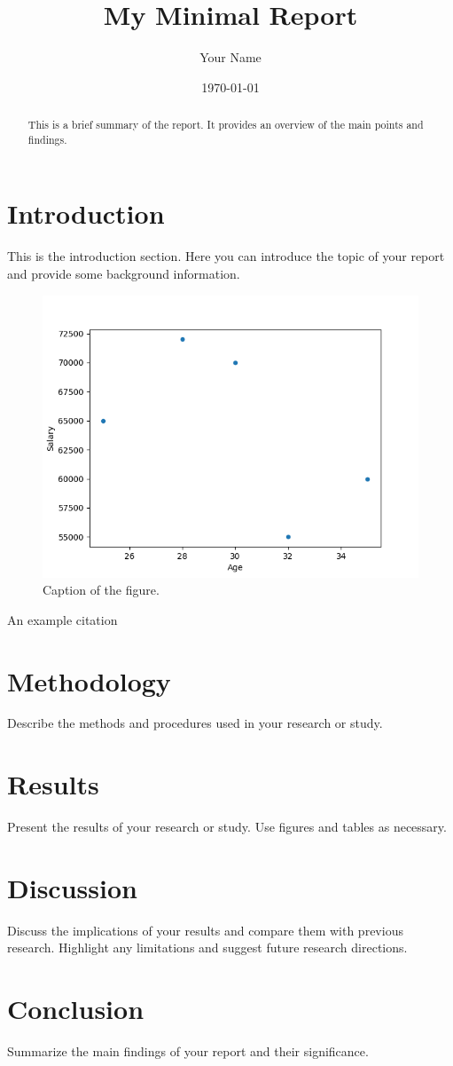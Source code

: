 \documentclass[a4paper, 12pt]{report}
\title{My Minimal Report}
\author{Your Name}
\date{\today}
\begin{document}
\maketitle

\begin{abstract}
This is a brief summary of the report. It provides an overview of the main points and findings.
\end{abstract}

\chapter{Introduction}
This is the introduction section. Here you can introduce the topic of your report and provide some background information.

\begin{figure}[htbp]
    \centering
    \includegraphics[width=1.0\textwidth]{../figures/demo.png}
    \caption{Caption of the figure.}
    \label{fig:examplebook}
\end{figure}

An example citation \cite{examplebook}

\chapter{Methodology}
Describe the methods and procedures used in your research or study.

\chapter{Results}
Present the results of your research or study. Use figures and tables as necessary.

\chapter{Discussion}
Discuss the implications of your results and compare them with previous research. Highlight any limitations and suggest future research directions.

\chapter{Conclusion}
Summarize the main findings of your report and their significance.

\printbibliography
\end{document}
